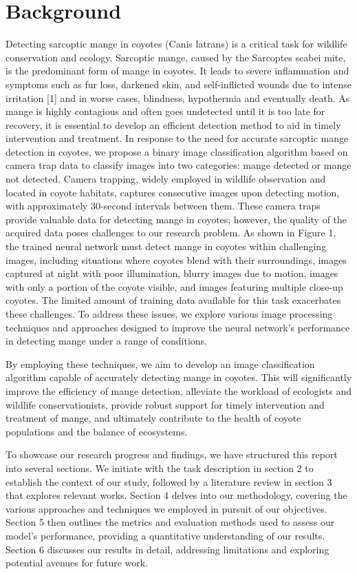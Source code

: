 \documentclass{article}
\begin{document}
\section{Background}
Detecting sarcoptic mange in coyotes (Canis latrans) is a critical task for wildlife conservation and ecology. Sarcoptic mange, caused by the Sarcoptes scabei mite, is the predominant form of mange in coyotes. It leads to severe inflammation and symptoms such as fur loss, darkened skin, and self-inflicted wounds due to intense irritation [1] and in worse cases, blindness, hypothermia and eventually death. As mange is highly contagious and often goes undetected until it is too late for recovery, it is essential to develop an efficient detection method to aid in timely intervention and treatment.
In response to the need for accurate sarcoptic mange detection in coyotes, we propose a binary image classification algorithm based on camera trap data to classify images into two categories: mange detected or mange not detected. Camera trapping, widely employed in wildlife observation and located in coyote habitats, captures consecutive images upon detecting motion, with approximately 30-second intervals between them. These camera traps provide valuable data for detecting mange in coyotes; however, the quality of the acquired data poses challenges to our research problem.
As shown in Figure 1, the trained neural network must detect mange in coyotes within challenging images, including situations where coyotes blend with their surroundings, images captured at night with poor illumination, blurry images due to motion, images with only a portion of the coyote visible, and images featuring multiple close-up coyotes. The limited amount of training data available for this task exacerbates these challenges. To address these issues, we explore various image processing techniques and approaches designed to improve the neural network's performance in detecting mange under a range of conditions.


By employing these techniques, we aim to develop an image classification algorithm capable of accurately detecting mange in coyotes. This will significantly improve the efficiency of mange detection, alleviate the workload of ecologists and wildlife conservationists, provide robust support for timely intervention and treatment of mange, and ultimately contribute to the health of coyote populations and the balance of ecosystems.

To showcase our research progress and findings, we have structured this report into several sections. We initiate with the task description in section 2 to establish the context of our study, followed by a literature review in section 3 that explores relevant works. Section 4 delves into our methodology, covering the various approaches and techniques we employed in pursuit of our objectives. Section 5 then outlines the metrics and evaluation methods used to assess our model's performance, providing a quantitative understanding of our results. Section 6 discusses our results in detail, addressing limitations and exploring potential avenues for future work. 
\end{document}
